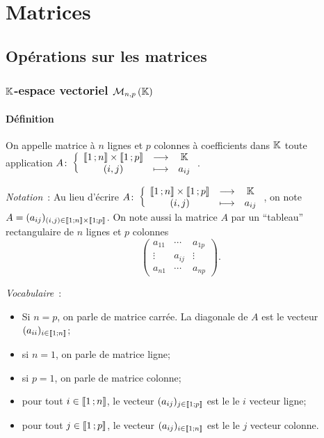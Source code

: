 \chapter{Matrices}\label{chap:matrices}
\minitoc%
\minilof%
\minilot%

\section{Opérations sur les matrices}

\subsection{\(\mathbb{K}\)-espace vectoriel \(\mathcal{M}_{n,p}\left(\mathbb{K}\right)\)}

\subsubsection{Définition}

\begin{defdef}
  On appelle matrice à \(n\) lignes et \(p\) colonnes à coefficients dans \(\mathbb{K}\)
  toute application \(A\colon\left\{\begin{array}{ccc}\mathopen{\llbracket}1\mathclose{}\mathpunct{};n\mathclose{\rrbracket} \times
  \mathopen{\llbracket}1\mathclose{}\mathpunct{};p\mathclose{\rrbracket} & \longrightarrow &\mathbb{K}\\(i,j) & \longmapsto & a_{ij}\end{array}\right.\).
\end{defdef}

\emph{Notation}~: Au lieu d'écrire \(A\colon\left\{\begin{array}{ccc}\mathopen{\llbracket}1\mathclose{}\mathpunct{};n\mathclose{\rrbracket} \times
\mathopen{\llbracket}1\mathclose{}\mathpunct{};p\mathclose{\rrbracket} & \longrightarrow &\mathbb{K}\\(i,j) & \longmapsto & a_{ij}\end{array}\right.\), on note \(A=(a_{ij})_{(i,j)\in
\mathopen{\llbracket}1\mathclose{}\mathpunct{};n\mathclose{\rrbracket} \times \mathopen{\llbracket}1\mathclose{}\mathpunct{};p\mathclose{\rrbracket}}\). On note aussi la
matrice \(A\) par un ``tableau'' rectangulaire de \(n\) lignes et \(p\) colonnes
\begin{equation}
  \begin{pmatrix}
    a_{11} & \cdots & a_{1p} \\
    \vdots & a_{ij} & \vdots \\
    a_{n1} & \cdots & a_{np}
  \end{pmatrix}.
\end{equation}

\emph{Vocabulaire}~:
\begin{itemize}
  \item Si \(n=p\), on parle de matrice carrée. La diagonale de \(A\) est le
    vecteur \((a_{ii})_{i \in \mathopen{\llbracket}1\mathclose{}\mathpunct{};n\mathclose{\rrbracket}}\);
  \item si \(n=1\), on parle de matrice ligne;
  \item si \(p=1\), on parle de matrice colonne;
  \item pour tout \(i \in \mathopen{\llbracket}1\mathclose{}\mathpunct{};n\mathclose{\rrbracket}\), le vecteur \((a_{ij})_{j
    \in \mathopen{\llbracket}1\mathclose{}\mathpunct{};p\mathclose{\rrbracket}}\) est le le \(i\)\ieme{} vecteur ligne;
  \item pour tout \(j \in \mathopen{\llbracket}1\mathclose{}\mathpunct{};p\mathclose{\rrbracket}\), le vecteur \((a_{ij})_{i
    \in \mathopen{\llbracket}1\mathclose{}\mathpunct{};n\mathclose{\rrbracket}}\) est le le \(j\)\ieme{} vecteur colonne.
\end{itemize}

